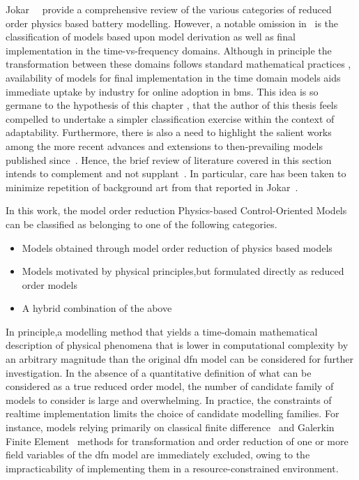 Jokar~\etal~\cite{Jokar2016} provide a comprehensive review of the various categories of reduced order physics based
battery modelling. However, a notable omission in~\cite{Jokar2016} is the classification of models based upon model
derivation as well as final implementation in the time-vs-frequency domains. Although in principle the transformation
between these domains follows standard mathematical practices , availability of models for final
implementation in the time domain models aids immediate uptake by industry for online adoption in \gls{bms}. This idea
is so germane to the hypothesis of this chapter , that the author of this thesis feels compelled to undertake a simpler classification exercise within the context
of adaptability. Furthermore, there is also a need to highlight the salient works among the more recent advances and
extensions to then-prevailing models published since~\cite{Jokar2016}. Hence, the brief review of literature covered in
this section intends to complement and not supplant~\cite{Jokar2016}. In particular, care has been taken to minimize
repetition of background art from that reported in Jokar~\etal{}.

In this work, the model order reduction Physics-based Control-Oriented Models can be classified as belonging to one of
the following categories.

\begin{itemize}
    \item Models obtained through model order reduction of physics based models
    \item Models motivated by physical principles,but formulated directly as reduced order models
    \item A hybrid combination of the above
\end{itemize}

In principle,a modelling method that yields a time-domain mathematical description of physical phenomena that is lower
in computational complexity by an arbitrary magnitude than the original \gls{dfn} model can be considered for further
investigation. In the absence of a quantitative definition of what can be considered as a true reduced order model, the
number of candidate family of models to consider is large and overwhelming. In practice, the constraints of realtime
implementation limits the choice of candidate modelling families. For instance, models relying primarily on classical
finite difference~\cite{Smith2006} and Galerkin Finite Element~\cite{Dao2012} methods for transformation and order
reduction of one or more field variables of the \gls{dfn} model are immediately excluded, owing to the impracticability
of implementing them in a resource-constrained environment.

